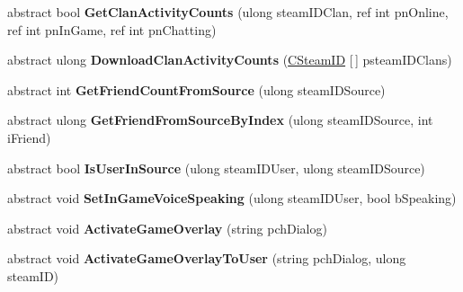 \begin{DoxyCompactItemize}
abstract bool {\bfseries Get\+Clan\+Activity\+Counts} (ulong steam\+I\+D\+Clan, ref int pn\+Online, ref int pn\+In\+Game, ref int pn\+Chatting)
\item 
\mbox{\label{class_valve_1_1_steamworks_1_1_i_steam_friends_a4da5bda3804701c9e5eae29be6a09cdb}} 
abstract ulong {\bfseries Download\+Clan\+Activity\+Counts} (\hyperlink{struct_valve_1_1_steamworks_1_1_c_steam_i_d}{C\+Steam\+ID} \mbox{[}$\,$\mbox{]} psteam\+I\+D\+Clans)
\item 
\mbox{\label{class_valve_1_1_steamworks_1_1_i_steam_friends_a222b1b89a7b4712abbe08ef1384195fa}} 
abstract int {\bfseries Get\+Friend\+Count\+From\+Source} (ulong steam\+I\+D\+Source)
\item 
\mbox{\label{class_valve_1_1_steamworks_1_1_i_steam_friends_abf8cb9eb5ab9ade19d2d96169948bde0}} 
abstract ulong {\bfseries Get\+Friend\+From\+Source\+By\+Index} (ulong steam\+I\+D\+Source, int i\+Friend)
\item 
\mbox{\label{class_valve_1_1_steamworks_1_1_i_steam_friends_aa35dea284366e61fdf9ed48fe85a6d7e}} 
abstract bool {\bfseries Is\+User\+In\+Source} (ulong steam\+I\+D\+User, ulong steam\+I\+D\+Source)
\item 
\mbox{\label{class_valve_1_1_steamworks_1_1_i_steam_friends_afe9cb07c47e8b8d1b2096d4ddb7ddd6d}} 
abstract void {\bfseries Set\+In\+Game\+Voice\+Speaking} (ulong steam\+I\+D\+User, bool b\+Speaking)
\item 
\mbox{\label{class_valve_1_1_steamworks_1_1_i_steam_friends_acdb20afd762fa2851699af0b3d2dc96e}} 
abstract void {\bfseries Activate\+Game\+Overlay} (string pch\+Dialog)
\item 
\mbox{\label{class_valve_1_1_steamworks_1_1_i_steam_friends_a9cdc153471227cb663f4fa3eadbf279a}} 
abstract void {\bfseries Activate\+Game\+Overlay\+To\+User} (string pch\+Dialog, ulong steam\+ID)
\item 
\mbox{\label{class_valve_1_1_steamworks_1_1_i_steam_friends_a57e252fda327fe85a4c925dbf3662d2d}} 

\end{DoxyCompactItemize}
